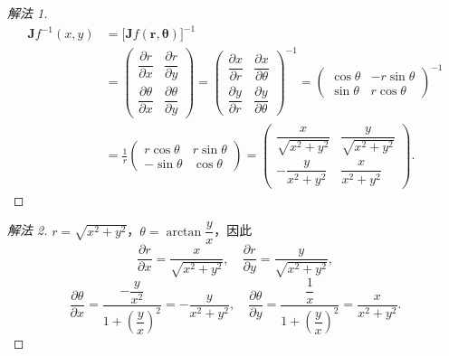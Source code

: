 \begin{proof}[解法 1]
\begin{align*}
  \boldsymbol{J}f^{-1}(x,y) &= \bigl[\boldsymbol{J}f(\boldsymbol{r},\boldsymbol{\theta})\bigr]^{-1} \\
  &= \begin{pmatrix} \dfrac{\partial r}{\partial x} & \dfrac{\partial r}{\partial y} \\[6pt] \dfrac{\partial\theta}{\partial x} & \dfrac{\partial\theta}{\partial y} \end{pmatrix} = \begin{pmatrix} \dfrac{\partial x}{\partial r} & \dfrac{\partial x}{\partial\theta} \\[6pt] \dfrac{\partial y}{\partial r} & \dfrac{\partial y}{\partial\theta} \end{pmatrix}^{-1} = \begin{pmatrix} \cos\theta & -r\sin\theta \\ \sin\theta & r\cos\theta \end{pmatrix}^{-1} \\
  &= \frac{1}{r}\begin{pmatrix} r\cos\theta & r\sin\theta \\ -\sin\theta & \cos\theta \end{pmatrix} = \begin{pmatrix} \dfrac{x}{\sqrt{x^{2}+y^{2}}} & \dfrac{y}{\sqrt{x^{2}+y^{2}}} \\[8pt] -\dfrac{y}{x^{2}+y^{2}} & \dfrac{x}{x^{2}+y^{2}} \end{pmatrix}.
\end{align*}
\end{proof}

\begin{proof}[解法 2]
$r = \sqrt{x^{2}+y^{2}}$，$\theta = \arctan\dfrac{y}{x}$，因此
\[
  \frac{\partial r}{\partial x} = \frac{x}{\sqrt{x^{2}+y^{2}}},\quad \frac{\partial r}{\partial y} = \frac{y}{\sqrt{x^{2}+y^{2}}},
\]
\[
  \frac{\partial\theta}{\partial x} = \frac{-\dfrac{y}{x^{2}}}{1 + \left(\dfrac{y}{x}\right)^{2}} = -\frac{y}{x^{2}+y^{2}},\quad \frac{\partial\theta}{\partial y} = \frac{\dfrac{1}{x}}{1 + \left(\dfrac{y}{x}\right)^{2}} = \frac{x}{x^{2}+y^{2}}.
\]
\end{proof}

